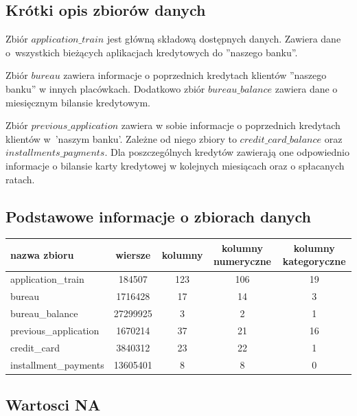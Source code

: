 \documentclass[12pt]{article}
\begin{document}
\subsection{Krótki opis zbiorów danych}

Zbiór $application\_train$ jest główną składową dostępnych danych. Zawiera dane o~wszystkich bieżących aplikacjach kredytowych do ''naszego banku''.

Zbiór $bureau$ zawiera informacje o poprzednich kredytach klientów  ''naszego banku'' w innych placówkach. Dodatkowo zbiór $bureau\_balance$ zawiera dane o miesięcznym bilansie kredytowym.

Zbiór $previous\_application$ zawiera w sobie informacje o poprzednich kredytach klientów w~'naszym banku'. Zależne od niego zbiory to $credit\_card\_balance$ oraz  $installments\_payments$. Dla poszczególnych kredytów zawierają one odpowiednio informacje o bilansie karty kredytowej w kolejnych miesiącach oraz o spłacanych ratach.

\subsection{Podstawowe informacje o zbiorach danych}

\FloatBarrier

\begin{table}[h]
\begin{tabular}{lcccc}

nazwa zbioru & wiersze & kolumny & kolumny numeryczne & kolumny kategoryczne \\
\hline \hline
application\_train    & 184507 & 123 & 106 & 19   \\
bureau                & 1716428 & 17 & 14 & 3  \\
bureau\_balance       & 27299925 & 3 & 2 & 1 \\
previous\_application & 1670214  & 37 & 21 &  16 \\
credit\_card          & 3840312  & 23 & 22 & 1   \\
installment\_payments & 13605401 & 8 & 8 & 0  \\
\end{tabular}
\end{table}

\FloatBarrier

\subsection{Wartosci NA}
\end{document}
